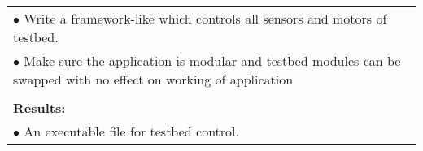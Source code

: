 \begin{table}[!h]
\begin{center}
\begin{tabular}{|p{}||p{}|p{}||p{}|}
            \multicolumn{4}{|p{.95\columnwidth}|}{$\bullet$ Write a framework-like which controls all sensors and motors of testbed.}\\
            \multicolumn{4}{|p{.95\columnwidth}|}{$\bullet$ Make sure the application is modular and testbed modules can be swapped with no effect on working of application}\\
            \multicolumn{4}{|p{.95\columnwidth}|}{}\\
            \multicolumn{4}{|p{.95\columnwidth}|}{\textbf{Results:}}\\
            \multicolumn{4}{|p{.95\columnwidth}|}{$\bullet$ An executable file for testbed control.}\\
            \hline
        \end{tabular}
    \end{center}
\end{table}

\clearpage


